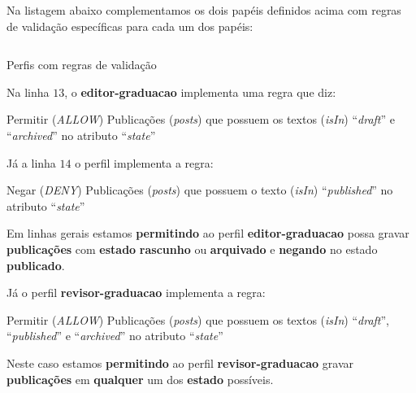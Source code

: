 Na listagem abaixo complementamos os dois papéis definidos acima com regras de validação específicas para cada um dos papéis:

\begin{code}
    \inputminted[xleftmargin=20pt,fontsize=\footnotesize,breaklines,breakanywhere,linenos=true,label=Rules.js]{JavaScript}{../RS0005/anexos/validator.js}
    \caption{Perfis com regras de validação}\label{RS0005:code:validator}
\end{code}

Na linha $13$, o \textbf{editor-graduacao} implementa uma regra que diz:

\begin{displayquote}
    Permitir (\textit{ALLOW}) Publicações (\textit{posts}) que possuem os textos (\textit{isIn}) ``\textit{draft}'' e ``\textit{archived}'' no atributo ``\textit{state}''
\end{displayquote}

Já a linha $14$ o perfil implementa a regra:

\begin{displayquote}
    Negar (\textit{DENY}) Publicações (\textit{posts}) que possuem o texto (\textit{isIn}) ``\textit{published}'' no atributo ``\textit{state}''
\end{displayquote}

Em linhas gerais estamos \textbf{permitindo} ao perfil \textbf{editor-graduacao} possa gravar \textbf{publicações} com \textbf{estado} \textbf{rascunho} ou \textbf{arquivado} e \textbf{negando} no estado \textbf{publicado}.

Já o perfil \textbf{revisor-graduacao} implementa a regra:

\begin{displayquote}
    Permitir (\textit{ALLOW}) Publicações (\textit{posts}) que possuem os textos (\textit{isIn}) ``\textit{draft}'', ``\textit{published}'' e ``\textit{archived}'' no atributo ``\textit{state}''
\end{displayquote}

Neste caso estamos \textbf{permitindo} ao perfil \textbf{revisor-graduacao} gravar \textbf{publicações} em \textbf{qualquer} um dos \textbf{estado} possíveis.